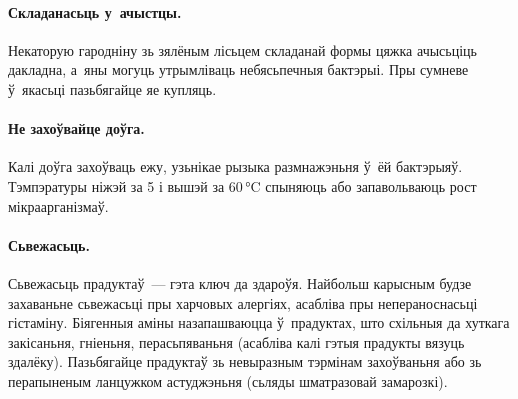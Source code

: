 \paragraph{Складанасьць у~ачыстцы.}
Некаторую гародніну зь зялёным лісьцем складанай формы цяжка ачысьціць дакладна, а~яны могуць утрымліваць небясьпечныя бактэрыі. Пры сумневе ў~якасьці пазьбягайце яе купляць.

\paragraph{Не захоўвайце доўга.}
Калі доўга захоўваць ежу, узьнікае рызыка размнажэньня ў~ёй бактэрыяў. Тэмпэратуры ніжэй за 5 і вышэй за 60\,°C спыняюць або запавольваюць рост мікраарганізмаў.

\paragraph{Сьвежасьць.}
Сьвежасьць прадуктаў~--- гэта ключ да здароўя. Найбольш карысным будзе захаваньне сьвежасьці пры харчовых алергіях, асабліва пры непераноснасьці гістаміну. Біягенныя аміны назапашваюцца ў~прадуктах, што схільныя да хуткага закісаньня, гніеньня, перасьпяваньня (асабліва калі гэтыя прадукты вязуць здалёку). Пазьбягайце прадуктаў зь невыразным тэрмінам захоўваньня або зь перапыненым ланцужком астуджэньня (сьляды шматразовай замарозкі).

